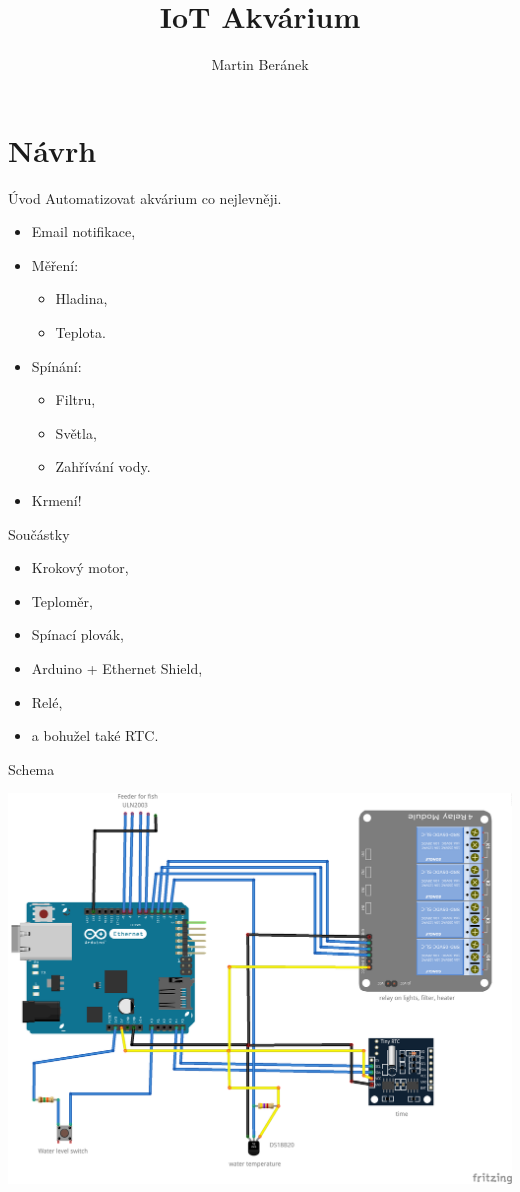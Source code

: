\documentclass{beamer}
\title{IoT Akvárium}
\author{Martin Beránek}
\begin{document}
	\frame{\titlepage}
	\section{Návrh}
	\begin{frame}{Úvod}
		Automatizovat akvárium co nejlevněji.
		\begin{itemize}
			\item Email notifikace,
			\item Měření:
			\begin{itemize}
				\item Hladina,
				\item Teplota.
			\end{itemize}
			\item Spínání:
			\begin{itemize}
				\item Filtru,
				\item Světla,
				\item Zahřívání vody.
			\end{itemize}
			\item Krmení!
		\end{itemize}
	\end{frame}
	\begin{frame}{Součástky}
		\begin{itemize}
			\item Krokový motor,
			\item Teploměr,
			\item Spínací plovák,
			\item Arduino + Ethernet Shield,
			\item Relé,
			\item a bohužel také RTC.   			
		\end{itemize}
	\end{frame}
	\begin{frame}{Schema}
		\begin{center}
			\includegraphics[scale=0.4]{schema_bb.png}
		\end{center}
	\end{frame}
\end{document}

